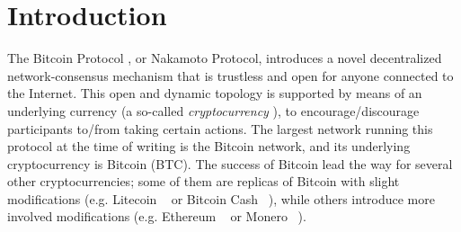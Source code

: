 \documentclass[a4paper,english,cleveref, autoref,numberwithinsect]{lipics-v2019}
\begin{document}
\begin{abstract}
\end{abstract}

\clearpage

\section{Introduction}

The Bitcoin Protocol \cite{Bitcoin,DBLP:books/daglib/0040621,NC17}, or Nakamoto Protocol, introduces a novel decentralized network-consensus mechanism that is trustless and open for anyone connected to the Internet. This open and dynamic topology is supported by means of an 
underlying currency (a so-called \emph{cryptocurrency} \cite{NC17}), to encourage/discourage participants to/from taking certain actions. The largest network running this protocol at the time of writing is the Bitcoin network, and its underlying cryptocurrency is Bitcoin (BTC). The success of Bitcoin lead the way for several other cryptocurrencies; some of them 
are replicas of Bitcoin with slight modifications (e.g. Litecoin%
~\cite{Litecoin} 
or Bitcoin Cash%
~\cite{Bcash}), 
while others introduce more involved modifications 
(e.g. Ethereum%
~\cite{Ethereum,E17} 
or Monero%
~\cite{Monero}).
\end{document}
